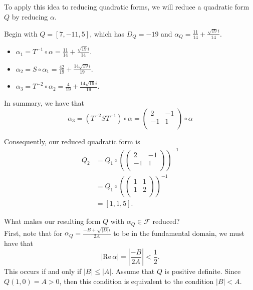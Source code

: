 \documentclass[11pt]{article}
\begin{document}
To apply this idea to reducing quadratic forms, we will reduce a quadratic form $Q$ by reducing $\alpha$.
\begin{eg}
Begin with $Q = [7, -11, 5]$, which has $D_Q = -19$ and $\alpha_Q = \frac{11}{14} + \frac{\sqrt{19}i }{14}$.
    \begin{itemize}
        \item $\alpha_1 = T^{-1} \circ \alpha = \frac{11}{14} + \frac{\sqrt{19}i }{14}$.
        \item $\alpha_2 = S \circ \alpha_1 = \frac{42}{19} + \frac{14\sqrt{19}i }{19}$.
        \item $\alpha_3 = T^{-2} \circ \alpha_2 = \frac{4}{19} + \frac{14\sqrt{19}i }{19}$.
    \end{itemize}
    
    In summary, we have that
    \[
        \alpha_3 = (T^{-2} S T^{-1}) \circ \alpha = \begin{pmatrix}
        2     & -1  \\
        -1    &  1  \\
        \end{pmatrix} \circ \alpha
    \]

    Consequently, our reduced quadratic form is
    \begin{align*}
        Q_2 &= Q_1 \circ \left( \begin{pmatrix}
            2     & -1  \\
            -1    &  1  \\
            \end{pmatrix}\right)^{-1} \\
            &= Q_1 \circ \left( \begin{pmatrix}
            1     & 1  \\
            1    &  2  \\
            \end{pmatrix}\right)^{-1} \\
            &= [1, 1, 5].
    \end{align*}
\end{eg}

What makes our resulting form $Q$ with $\alpha_Q \in \mathcal{F}$ reduced? \\

First, note that for $\alpha_Q = \frac{-B + \sqrt{|D|}i}{2A}$ to be in the fundamental domain, we must have that
\[
    | \mathrm{Re} \, \alpha| = \left|\frac{-B}{2A}\right|< \frac{1}{2}.
\]
This occurs if and only if $|B| \leq |A|$. Assume that $Q$ is positive definite. Since $Q(1, 0) = A > 0$, then this condition is equivalent to
the condition $|B| < A$. \\
\end{document}
